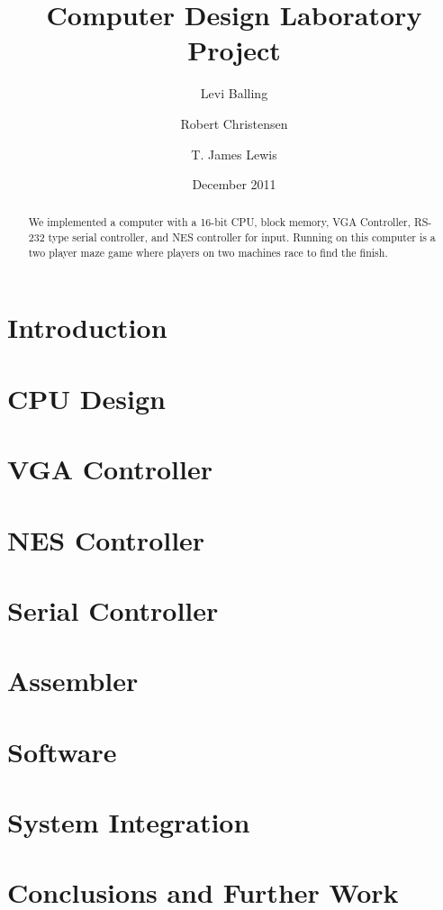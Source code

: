 \documentclass{article}
\title{Computer Design Laboratory Project}
\author{Levi Balling \and Robert Christensen \and T. James Lewis}
\date{December 2011}
\begin{document}
\maketitle
\pagebreak


\begin{abstract}
	We implemented a computer with a 16-bit CPU, block memory, VGA Controller, RS-232 type serial controller, and NES controller for input. Running on this computer is a two player maze game where players on two machines race to find the finish.  
\end{abstract}

\section{Introduction}

\section{CPU Design}

\section{VGA Controller}

\section{NES Controller}

\section{Serial Controller}

\section{Assembler}

\section{Software}

\section{System Integration}

\section{Conclusions and Further Work}
\end{document}
